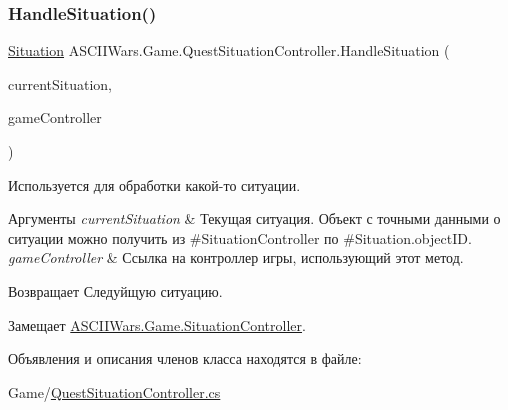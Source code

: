 \subsubsection{\texorpdfstring{Handle\+Situation()}{HandleSituation()}}
{\footnotesize\ttfamily \hyperlink{class_a_s_c_i_i_wars_1_1_game_1_1_situation}{Situation} A\+S\+C\+I\+I\+Wars.\+Game.\+Quest\+Situation\+Controller.\+Handle\+Situation (\begin{DoxyParamCaption}\item[{\hyperlink{class_a_s_c_i_i_wars_1_1_game_1_1_situation}{Situation}}]{current\+Situation,  }\item[{\hyperlink{class_a_s_c_i_i_wars_1_1_game_1_1_game_controller}{Game\+Controller}}]{game\+Controller }\end{DoxyParamCaption})\hspace{0.3cm}{\ttfamily [inline]}}



Используется для обработки какой-\/то ситуации. 


\begin{DoxyParams}{Аргументы}
{\em current\+Situation} & Текущая ситуация. Объект с точными данными о ситуации можно получить из \#\+Situation\+Controller по \#\+Situation.\+object\+ID. \\
\hline
{\em game\+Controller} & Ссылка на контроллер игры, использующий этот метод. \\
\hline
\end{DoxyParams}
\begin{DoxyReturn}{Возвращает}
Следуйщую ситуацию. 
\end{DoxyReturn}


Замещает \hyperlink{interface_a_s_c_i_i_wars_1_1_game_1_1_situation_controller_a2cf0359dfc1683beb63f0dfed1c372e6}{A\+S\+C\+I\+I\+Wars.\+Game.\+Situation\+Controller}.



Объявления и описания членов класса находятся в файле\+:\begin{DoxyCompactItemize}
\item 
Game/\hyperlink{_quest_situation_controller_8cs}{Quest\+Situation\+Controller.\+cs}\end{DoxyCompactItemize}
